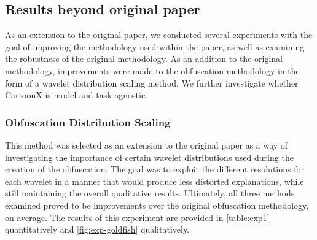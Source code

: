 \subsection{Results beyond original paper}
 As an extension to the original paper, we conducted several experiments with the goal of improving the methodology used within the paper, as well as examining the robustness of the original methodology. As an addition to the original methodology, improvements were made to the obfuscation methodology in the form of a wavelet distribution scaling method. We further investigate whether CartoonX is model and task-agnostic.
\subsubsection{Obfuscation Distribution Scaling}
This method was selected as an extension to the original paper as a way of investigating the importance of certain wavelet distributions used during the creation of the obfuscation. The goal was to exploit the different resolutions for each wavelet in a manner that would produce less distorted explanations, while still maintaining the overall qualitative results. Ultimately, all three methods examined proved to be improvements over the original obfuscation methodology, on average. The results of this experiment are provided in \autoref{table:exp1} quantitatively and \autoref{fig:exp-goldfish} qualitatively.



